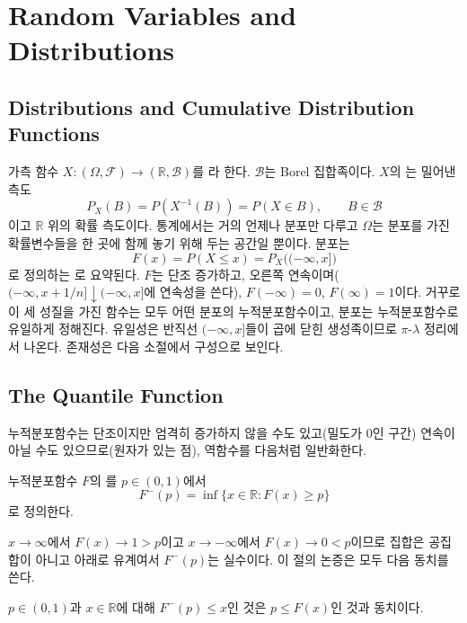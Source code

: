 \section{Random Variables and Distributions}
\label{sec:random-variables}

\subsection{Distributions and Cumulative Distribution Functions}

가측 함수 $X:(\Omega,\mathcal F)\to(\mathbb R,\mathcal B)$를 라 한다. $\mathcal B$는 Borel 집합족이다. $X$의 는 밀어낸 측도
\[
P_X(B)=P(X^{-1}(B))=P(X\in B),\qquad B\in\mathcal B
\]
이고 $\mathbb R$ 위의 확률 측도이다. 통계에서는 거의 언제나 분포만 다루고 $\Omega$는 분포를 가진 확률변수들을 한 곳에 함께 놓기 위해 두는 공간일 뿐이다. 분포는
\[
F(x)=P(X\le x)=P_X\bigl((-\infty,x]\bigr)
\]
로 정의하는 로 요약된다. $F$는 단조 증가하고, 오른쪽 연속이며($(-\infty,x+1/n]\downarrow(-\infty,x]$에 연속성을 쓴다), $F(-\infty)=0$, $F(\infty)=1$이다. 거꾸로 이 세 성질을 가진 함수는 모두 어떤 분포의 누적분포함수이고, 분포는 누적분포함수로 유일하게 정해진다. 유일성은 반직선 $(-\infty,x]$들이 곱에 닫힌 생성족이므로 $\pi$-$\lambda$ 정리에서 나온다\cite{billingsley1995}. 존재성은 다음 소절에서 구성으로 보인다.

\subsection{The Quantile Function}

누적분포함수는 단조이지만 엄격히 증가하지 않을 수도 있고(밀도가 $0$인 구간) 연속이 아닐 수도 있으므로(원자가 있는 점), 역함수를 다음처럼 일반화한다.

\begin{definition}
누적분포함수 $F$의 를 $p\in(0,1)$에서
\[
F^{-}(p)=\inf\{x\in\mathbb R:F(x)\ge p\}
\]
로 정의한다.
\end{definition}

$x\to\infty$에서 $F(x)\to1>p$이고 $x\to-\infty$에서 $F(x)\to0<p$이므로 집합은 공집합이 아니고 아래로 유계여서 $F^{-}(p)$는 실수이다. 이 절의 논증은 모두 다음 동치를 쓴다.

\begin{lemma}
\label{lem:quantile-galois}
$p\in(0,1)$과 $x\in\mathbb R$에 대해 $F^{-}(p)\le x$인 것은 $p\le F(x)$인 것과 동치이다.
\end{lemma}

